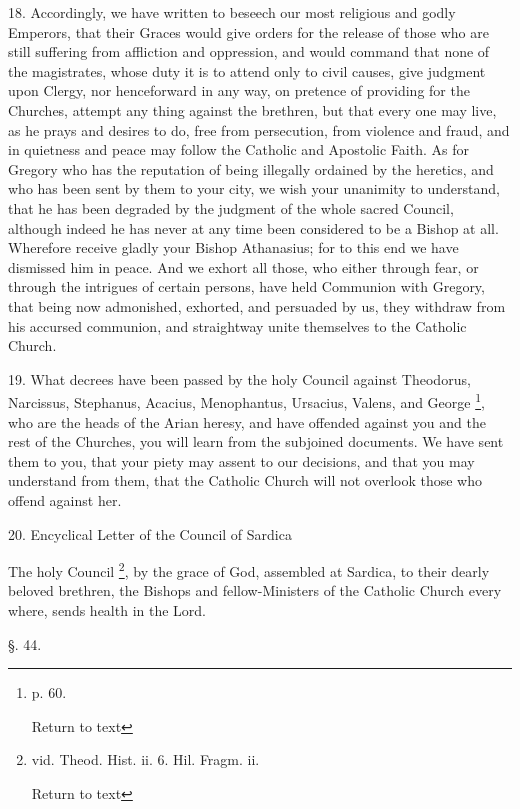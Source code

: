 18. Accordingly, we have written to beseech our
most religious and godly Emperors, that their Graces would give orders
for the release of those who are still suffering from affliction and
oppression, and would command that none of the magistrates, whose duty
it is to attend only to civil causes, give judgment upon Clergy, nor
henceforward in any way, on pretence of providing for the Churches,
attempt any thing against the brethren, but that every one may live,
as he prays and desires to do, free from persecution, from violence
and fraud, and in quietness and peace may follow the Catholic and
Apostolic Faith. As for Gregory who has the reputation of being
illegally ordained by the heretics, and who has been sent by them to
your city, we wish your unanimity to understand, that he has been
degraded by the judgment of the whole sacred Council, although indeed
he has never at any time been considered to be a Bishop at all.
Wherefore receive gladly your Bishop Athanasius; for to this end we
have dismissed him in peace. And we exhort all those, who either
through fear, or through the intrigues of certain persons, have held
Communion with Gregory, that being now admonished, exhorted, and
persuaded by us, they withdraw from his accursed communion, and
straightway unite themselves to the Catholic Church.

19. What decrees have been passed by the holy
Council against Theodorus, Narcissus, Stephanus, Acacius, Menophantus,
Ursacius, Valens, and George \footnote{p. 60.

Return to text}, who are the heads of the Arian
heresy, and have offended against you and the rest of the Churches,
you will learn from the subjoined documents. We have sent them to you,
that your piety may assent to our decisions, and that you may
understand from them, that the Catholic Church will not overlook those
who offend against her.

20. Encyclical Letter of the Council of Sardica

The holy Council \footnote{vid. Theod. Hist. ii. 6. Hil. Fragm. ii.

Return to text}, by the grace of God,
assembled at Sardica, to their dearly beloved brethren, the Bishops
and fellow-Ministers of the Catholic Church every where, sends health
in the Lord.

§. 44.

